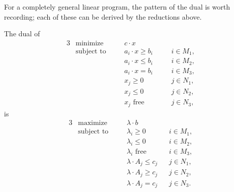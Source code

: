 \documentclass[a4paper]{scrartcl}
\begin{document}
For a completely general linear program, the pattern of the dual is worth recording; each of these can be derived by the reductions above.

\begin{proposition}
    The dual of
    \begin{alignat*}{3}
        & \text{minimize} \quad && c\cdot x && \\
        & \text{subject to} \quad && a_i \cdot x \geq b_i \quad&& i \in M_1,\\
        & && a_i \cdot x \leq b_i && i \in M_2,\\
        & && a_i \cdot x = b_i && i \in M_3,\\
        & && x_j \geq 0 && j \in N_1,\\
        & && x_j \leq 0 && j \in N_2,\\
        & && x_j \text{ free} && j \in N_3,
    \end{alignat*}
    is
    \begin{alignat*}{3}
        & \text{maximize} \quad && \lambda \cdot b && \\
        & \text{subject to} \quad && \lambda_i \geq 0 \quad&& i \in M_1,\\
        & && \lambda_i \leq 0 && i \in M_2,\\
        & && \lambda_i \text{ free} && i \in M_3,\\
        & && \lambda\cdot A_j \leq c_j && j \in N_1,\\
        & && \lambda \cdot A_j \geq c_j && j \in N_2,\\
        & && \lambda\cdot A_j = c_j && j \in N_3.
    \end{alignat*}
\end{proposition}
\end{document}
